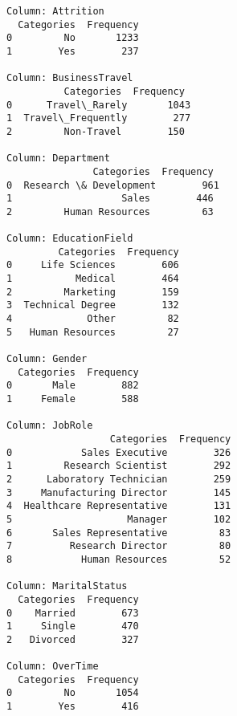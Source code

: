 \documentclass[11pt]{article}
\begin{document}
    \begin{Verbatim}[commandchars=\\\{\}]
Column: Attrition
  Categories  Frequency
0         No       1233
1        Yes        237

Column: BusinessTravel
          Categories  Frequency
0      Travel\_Rarely       1043
1  Travel\_Frequently        277
2         Non-Travel        150

Column: Department
               Categories  Frequency
0  Research \& Development        961
1                   Sales        446
2         Human Resources         63

Column: EducationField
         Categories  Frequency
0     Life Sciences        606
1           Medical        464
2         Marketing        159
3  Technical Degree        132
4             Other         82
5   Human Resources         27

Column: Gender
  Categories  Frequency
0       Male        882
1     Female        588

Column: JobRole
                  Categories  Frequency
0            Sales Executive        326
1         Research Scientist        292
2      Laboratory Technician        259
3     Manufacturing Director        145
4  Healthcare Representative        131
5                    Manager        102
6       Sales Representative         83
7          Research Director         80
8            Human Resources         52

Column: MaritalStatus
  Categories  Frequency
0    Married        673
1     Single        470
2   Divorced        327

Column: OverTime
  Categories  Frequency
0         No       1054
1        Yes        416

    \end{Verbatim}
\end{document}
